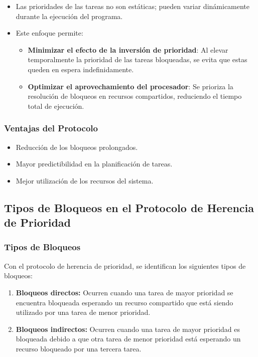 \documentclass[a4paper,12pt]{article}
\begin{document}
\begin{itemize}
    \item Las prioridades de las tareas no son estáticas; pueden variar dinámicamente durante la ejecución del programa.
    \item Este enfoque permite:
    \begin{itemize}
        \item \textbf{Minimizar el efecto de la inversión de prioridad}: 
        Al elevar temporalmente la prioridad de las tareas bloqueadas, se evita que estas queden en espera indefinidamente.
        \item \textbf{Optimizar el aprovechamiento del procesador}: 
        Se prioriza la resolución de bloqueos en recursos compartidos, reduciendo el tiempo total de ejecución.
    \end{itemize}
\end{itemize}

\subsubsection{Ventajas del Protocolo}

\begin{itemize}
    \item Reducción de los bloqueos prolongados.
    \item Mayor predictibilidad en la planificación de tareas.
    \item Mejor utilización de los recursos del sistema.
\end{itemize}







\subsection{Tipos de Bloqueos en el Protocolo de Herencia de Prioridad}

\subsubsection{Tipos de Bloqueos}
Con el protocolo de herencia de prioridad, se identifican los siguientes tipos de bloqueos:
\begin{enumerate}[label=\alph*)]
    \item \textbf{Bloqueos directos:} Ocurren cuando una tarea de mayor prioridad se encuentra bloqueada esperando un recurso compartido que está siendo utilizado por una tarea de menor prioridad.
    \item \textbf{Bloqueos indirectos:} Ocurren cuando una tarea de mayor prioridad es bloqueada debido a que otra tarea de menor prioridad está esperando un recurso bloqueado por una tercera tarea.
\end{enumerate}
\end{document}
